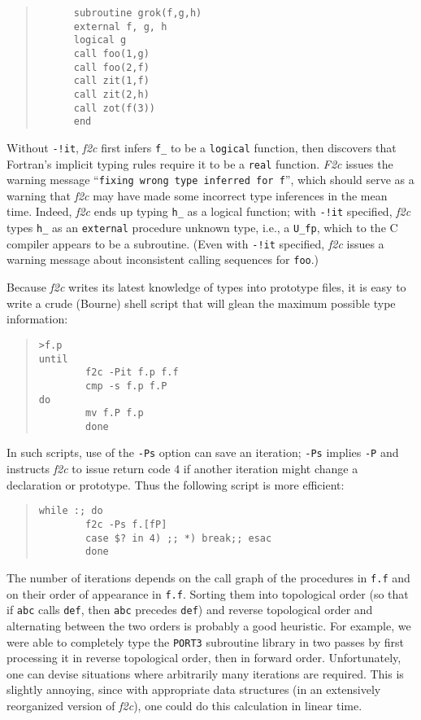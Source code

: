 \documentclass[10pt,a4paper]{article}
\begin{document}
\begin{quote}
\begin{verbatim}
      subroutine grok(f,g,h)
      external f, g, h
      logical g
      call foo(1,g)
      call foo(2,f)
      call zit(1,f)
      call zit(2,h)
      call zot(f(3))
      end
\end{verbatim}
\end{quote}
Without \verb|-!it|, \emph{f2c} first infers \verb|f_| to be a \verb|logical| function, then discovers that Fortran’s implicit typing rules require it to be a \verb|real| function. \emph{F2c} issues the warning message ``\texttt{fixing wrong type inferred for f}'', which should serve as a warning that \emph{f2c} may have made some incorrect type inferences in the mean time. Indeed, \emph{f2c} ends up typing \verb|h_| as a logical function; with \verb|-!it| specified, \emph{f2c} types \verb|h_| as an \verb|external| procedure unknown type, i.e., a \verb|U_fp|, which to the C compiler appears to be a subroutine. (Even with \verb|-!it| specified, \emph{f2c} issues a warning message about inconsistent calling sequences for \verb|foo|.)

Because \emph{f2c} writes its latest knowledge of types into prototype files, it is easy to write a crude (Bourne) shell script that will glean the maximum possible type information:
\begin{quote}
\begin{verbatim}
>f.p
until
        f2c -Pit f.p f.f
        cmp -s f.p f.P
do
        mv f.P f.p
        done
\end{verbatim}
\end{quote}
In such scripts, use of the \verb|-Ps| option can save an iteration; \verb|-Ps| implies \verb|-P| and instructs \emph{f2c} to issue return code 4 if another iteration might change a declaration or prototype. Thus the following script is more efficient:
\begin{quote}
\begin{verbatim}
while :; do
        f2c -Ps f.[fP]
        case $? in 4) ;; *) break;; esac
        done
\end{verbatim}
\end{quote}
The number of iterations depends on the call graph of the procedures in \verb|f.f| and on their order of appearance in \verb|f.f|. Sorting them into topological order (so that if \verb|abc| calls \verb|def|, then \verb|abc| precedes \verb|def|) and reverse topological order and alternating between the two orders is probably a good heuristic. For example, we were able to completely type the \verb|PORT3| subroutine library in two passes by first processing it in reverse topological order, then in forward order. Unfortunately, one can devise situations where arbitrarily many iterations are required. This is slightly annoying, since with appropriate data structures (in an extensively reorganized version of \emph{f2c}), one could do this calculation in linear time.
\end{document}
